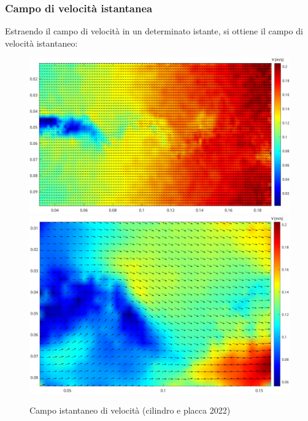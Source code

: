 \subsubsection{Campo di velocità istantanea}
Estraendo il campo di velocità in un determinato istante, si ottiene il campo di velocità istantaneo:
\begin{figure}[H]
    \centering
    \includegraphics[height=.52\textwidth]{images/11/f300_22b.png}
    \includegraphics[height=.5\textwidth]{images/11/f300_220.png}
    \caption{Campo istantaneo di velocità (cilindro e placca 2022)}
\end{figure}

